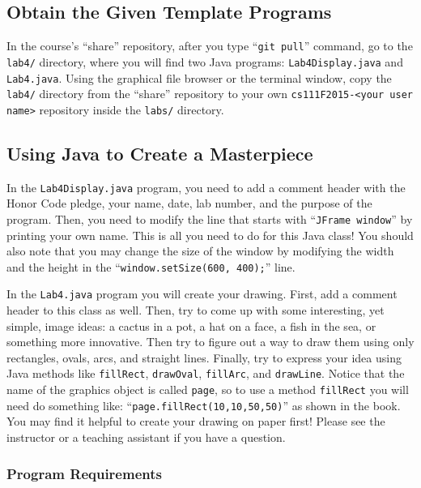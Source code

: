 \vspace{-0.05in}
\subsection*{Obtain the Given Template Programs}
\vspace{-0.05in}

In the course's ``share'' repository, after you type ``{\tt git pull}'' command, go to the {\tt lab4/} directory, where you
will find two Java programs: {\tt Lab4Display.java} and {\tt Lab4.java}. Using the graphical file browser or the
terminal window, copy the {\tt lab4/} directory from the ``share'' repository to your own {\tt cs111F2015-<your user
name>} repository inside the {\tt labs/} directory.

\subsection*{Using Java to Create a Masterpiece}

In the {\tt Lab4Display.java} program, you need to add a comment header with the Honor Code pledge, your name, date, lab
number, and the purpose of the program. Then, you need to modify the line that starts with ``{\tt JFrame window}'' by
printing your own name. This is all you need to do for this Java class! You should also note that you may change the size of
the window by modifying the width and the height in the ``{\tt window.setSize(600, 400);}'' line.

In the {\tt Lab4.java} program you will create your drawing. First, add a comment header to this class as well.  Then,
try to come up with some interesting, yet simple, image ideas: a cactus in a pot, a hat on a face, a fish in the sea, or
something more innovative.  Then try to figure out a way to draw them using only rectangles, ovals, arcs, and straight
lines.  Finally, try to express your idea using Java methods like {\tt fillRect}, {\tt drawOval}, {\tt fillArc}, and
{\tt drawLine}. Notice that the name of the graphics object is called {\tt page}, so to use a method {\tt fillRect} you
will need do something like: ``{\tt page.fillRect(10,10,50,50)}'' as shown in the book.  You may find it helpful to create
your drawing on paper first! Please see the instructor or a teaching assistant if you have a question.

\vspace*{-.1in}
\subsubsection*{Program Requirements}


